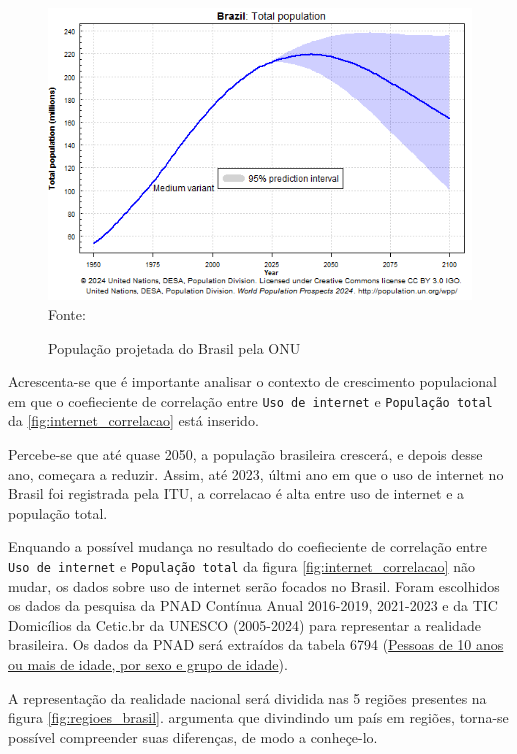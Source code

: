 \begin{figure}[ht]
    \centering
    \caption{População projetada do Brasil pela ONU}
    \includegraphics[width=1\linewidth]{figuras/populacao/populacao_brasil.png}
    \label{fig:populacao_brasil}
    \footnotesize{Fonte: \cite{ONU_populacao_brasil}}
\end{figure}

\newpage
Acrescenta-se que é importante analisar o contexto de crescimento populacional em que o coefieciente de correlação entre \texttt{Uso de internet} e \texttt{População total} da \ref{fig:internet_correlacao} está inserido. 

Percebe-se que até quase 2050, a população brasileira crescerá, e depois desse ano, começara a reduzir. Assim, até 2023, últmi ano em que o uso de internet no Brasil foi registrada pela ITU, a correlacao é alta entre uso de internet e a população total.

Enquando a possível mudança no resultado do coefieciente de correlação entre \texttt{Uso de internet} e \texttt{População total} da figura \ref{fig:internet_correlacao} não mudar, os dados sobre uso de internet serão focados no Brasil. Foram escolhidos os dados da pesquisa da PNAD Contínua Anual 2016-2019, 2021-2023 e da TIC Domicílios da Cetic.br da UNESCO (2005-2024) para representar a realidade brasileira. Os dados da PNAD será extraídos da tabela 6794 (\href{https://sidra.ibge.gov.br/tabela/6794}{Pessoas de 10 anos ou mais de idade, por sexo e grupo de idade}).

A representação da realidade nacional será dividida nas 5 regiões presentes na figura \ref{fig:regioes_brasil}. \cite{HAMAM_Cinco_2017} argumenta que divindindo um país em regiões, torna-se possível compreender suas diferenças, de modo a conheçe-lo.


